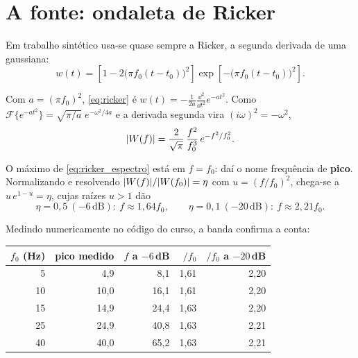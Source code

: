 \documentclass[11pt,a4paper,oneside]{report}
\begin{document}
\section{A fonte: ondaleta de Ricker}
\label{sec:ricker}

Em trabalho sint\'etico usa-se quase sempre a Ricker, a segunda derivada de
uma gaussiana:
\begin{equation}
w(t) = \left[1 - 2\bigl(\pi f_0 (t-t_0)\bigr)^{2}\right]
       \exp\left[-\bigl(\pi f_0 (t-t_0)\bigr)^{2}\right].
\label{eq:ricker}
\end{equation}

\begin{derivacao}
Com $a = (\pi f_0)^{2}$, \eqref{eq:ricker} \'e
$w(t) = -\frac{1}{2a}\frac{\dd^{2}}{\dd t^{2}} e^{-a t^{2}}$. Como
$\mathcal{F}\{e^{-at^{2}}\} = \sqrt{\pi/a}\;e^{-\omega^{2}/4a}$ e a derivada
segunda vira $(i\omega)^{2} = -\omega^{2}$,
\begin{equation}
\lvert W(f) \rvert = \frac{2}{\sqrt{\pi}}\,\frac{f^{2}}{f_0^{3}}\,
             e^{-f^{2}/f_0^{2}} .
\label{eq:ricker_espectro}
\end{equation}

O m\'aximo de \eqref{eq:ricker_espectro} est\'a em $f = f_0$: da\'i o nome
frequ\^encia de \textbf{pico}. Normalizando e resolvendo
$\lvert W(f) \rvert/\lvert W(f_0) \rvert = \eta$ com $u = (f/f_0)^{2}$, chega-se a
$u\,e^{1-u} = \eta$, cujas ra\'izes $u>1$ d\~ao
\[
\eta = 0{,}5\ (-6\,\text{dB}):\ f \approx 1{,}64 f_0,
\qquad
\eta = 0{,}1\ (-20\,\text{dB}):\ f \approx 2{,}21 f_0 .
\]
\end{derivacao}

Medindo numericamente no c\'odigo do curso, a banda confirma a conta:

\begin{center}
\begin{tabular}{@{}rrrrr@{}}
\toprule
$f_0$ (Hz) & pico medido & $f$ a $-6$\,dB & $/f_0$ & $/f_0$ a $-20$\,dB \\
\midrule
5  & 4{,}9  & 8{,}1  & 1{,}61 & 2{,}20 \\
10 & 10{,}0 & 16{,}1 & 1{,}61 & 2{,}20 \\
15 & 14{,}9 & 24{,}4 & 1{,}63 & 2{,}20 \\
25 & 24{,}9 & 40{,}8 & 1{,}63 & 2{,}21 \\
40 & 40{,}0 & 65{,}2 & 1{,}63 & 2{,}21 \\
\bottomrule
\end{tabular}
\end{center}
\end{document}

